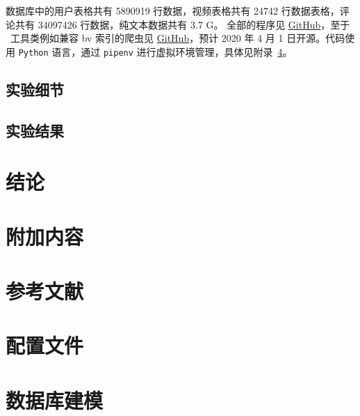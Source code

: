 数据库中的用户表格共有 5890919 行数据，视频表格共有 24742 行数据表格，评论共有 34097426 行数据，纯文本数据共有 3.7 G。
全部的程序见 \href{https://github.com/Iydon/homework/tree/master/CS307}{GitHub}，至于 \bilibili\ 工具类例如兼容 bv 索引的爬虫见 \href{https://github.com/iydon/bilibili}{GitHub}，预计 2020 年 4 月 1 日开源。代码使用 \texttt{Python} 语言，通过 \texttt{pipenv} 进行虚拟环境管理，具体见附录~\ref{A:config}。


\subsection{实验细节}
\lipsum[3]


\subsection{实验结果}
\lipsum[4]



\section{结论}
\lipsum[5]



\section{附加内容}
\lipsum[6]



\clearpage
\section{参考文献}
\nocite{*}
\printbibliography[heading=none]



\clearpage
\begin{appendices}
    \section{配置文件}\label{A:config}
    \section{数据库建模}\label{A:database}
\end{appendices}
